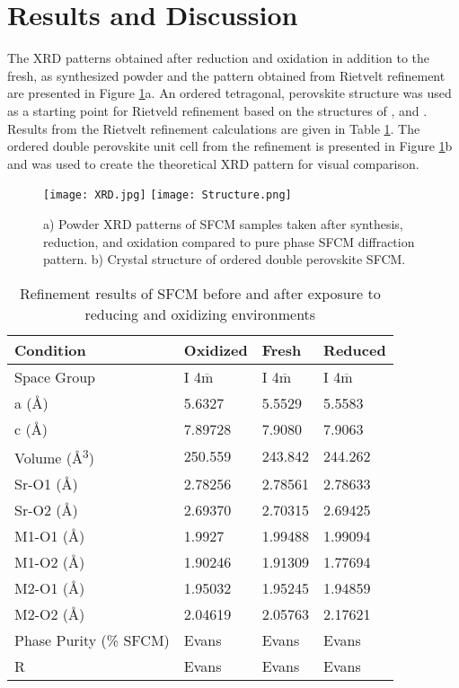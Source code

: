 \section{Results and Discussion}
    The XRD patterns obtained after reduction and oxidation in addition to the fresh, as synthesized powder and the pattern obtained from Rietvelt refinement are presented in Figure \ref{fig:structure}a.
    An ordered tetragonal, perovskite structure was used as a starting point for Rietveld refinement based on the structures of ,  and .\cite{Huang2009,Ritter2004}
    Results from the Rietvelt refinement calculations are given in Table \ref{tab:xrdrefine}.
    The ordered double perovskite unit cell from the refinement is presented in Figure \ref{fig:structure}b and was used to create the theoretical XRD pattern for visual comparison.

    \begin{figure}
      \texttt{[image: XRD.jpg]}
      \texttt{[image: Structure.png]}
      \caption{a) Powder XRD patterns of SFCM samples taken after synthesis, reduction, and oxidation compared to pure phase SFCM diffraction pattern. b) Crystal structure of ordered double perovskite SFCM. }
      \label{fig:structure}
    \end{figure}

    \begin{table}
        \centering
        \caption{Refinement results of SFCM before and after exposure to reducing and oxidizing environments}
        \label{tab:xrdrefine}
        \begin{tabular}{llll}
        Condition & Oxidized & Fresh   & Reduced  \\
        \hline
        Space Group                & I 4$\overline{\text{m}}$    & I 4$\overline{\text{m}}$   & I 4$\overline{\text{m}}$    \\
        a (\si{\angstrom})        & 5.6327   & 5.5529  & 5.5583   \\
        c (\si{\angstrom})        & 7.89728  & 7.9080 & 7.9063   \\
        Volume (\si{\angstrom\cubed})    & 250.559  & 243.842 & 244.262  \\
        Sr-O1 (\si{\angstrom})    & 2.78256  & 2.78561 & 2.78633  \\
        Sr-O2 (\si{\angstrom})    & 2.69370  & 2.70315 & 2.69425  \\
        M1-O1 (\si{\angstrom})    & 1.9927   & 1.99488 & 1.99094  \\
        M1-O2 (\si{\angstrom})    & 1.90246  & 1.91309 & 1.77694  \\
        M2-O1 (\si{\angstrom})    & 1.95032  & 1.95245 & 1.94859  \\
        M2-O2 (\si{\angstrom})    & 2.04619  & 2.05763 & 2.17621  \\
        Phase Purity (\% SFCM)    & Evans     & Evans    & Evans     \\
        R                         & Evans     & Evans    & Evans
        \end{tabular}
        \end{table}

